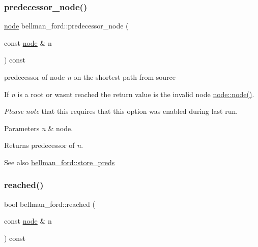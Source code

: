 \subsubsection{\texorpdfstring{predecessor\+\_\+node()}{predecessor\_node()}}
{\footnotesize\ttfamily \mbox{\hyperlink{classnode}{node}} bellman\+\_\+ford\+::predecessor\+\_\+node (\begin{DoxyParamCaption}\item[{const \mbox{\hyperlink{classnode}{node}} \&}]{n }\end{DoxyParamCaption}) const\hspace{0.3cm}{\ttfamily [inline]}}



predecessor of node {\itshape n} on the shortest path from source 

If {\itshape n} is a root or wasn\textquotesingle{}t reached the return value is the invalid node \mbox{\hyperlink{classnode_ad603259398d5667e3b97a6322a2bcc20}{node\+::node()}}.

{\itshape Please} {\itshape note} that this requires that this option was enabled during last run.


\begin{DoxyParams}{Parameters}
{\em n} & node. \\
\hline
\end{DoxyParams}
\begin{DoxyReturn}{Returns}
predecessor of {\itshape n}. 
\end{DoxyReturn}
\begin{DoxySeeAlso}{See also}
\mbox{\hyperlink{classbellman__ford_aac87169a3cf4f95477ce215a0cb7a12b}{bellman\+\_\+ford\+::store\+\_\+preds}} 
\end{DoxySeeAlso}
\mbox{\label{classbellman__ford_a93f7c34ec9662690230ca7a9c31933cd}} 
\subsubsection{\texorpdfstring{reached()}{reached()}}
{\footnotesize\ttfamily bool bellman\+\_\+ford\+::reached (\begin{DoxyParamCaption}\item[{const \mbox{\hyperlink{classnode}{node}} \&}]{n }\end{DoxyParamCaption}) const\hspace{0.3cm}{\ttfamily [inline]}}



